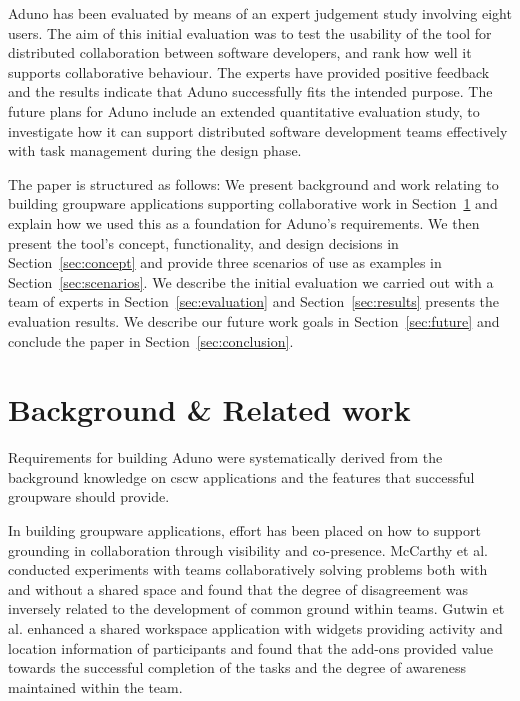\documentclass[conference]{IEEEtran}
\begin{document}
Aduno has been evaluated by means of an expert judgement study involving eight users. The aim of this initial evaluation was to test the usability of the tool for distributed collaboration between software developers, and rank how well it supports collaborative behaviour. The experts have provided positive feedback and the results indicate that Aduno successfully fits the intended purpose.  The future plans for Aduno include an extended quantitative evaluation study, to investigate how it can support distributed software development teams effectively with task management during the design phase.

The paper is structured as follows: We present background and work relating to building groupware applications supporting collaborative work in Section~\ref{sec:background} and explain how we used this as a foundation for Aduno's requirements. We then present the tool's concept, functionality, and design decisions in Section~\ref{sec:concept} and provide three scenarios of use as examples in Section~\ref{sec:scenarios}. We describe the initial evaluation we carried out with a team of experts in Section~\ref{sec:evaluation} and Section~\ref{sec:results} presents the evaluation results. We describe our future work goals in Section~\ref{sec:future} and conclude the paper in Section~\ref{sec:conclusion}.


\section{Background \& Related work}
\label{sec:background}

Requirements for building Aduno were systematically derived from the background knowledge on {\sc cscw} applications and the features that successful groupware should provide. 

In building groupware applications, effort has been placed on how to support grounding in collaboration through visibility and co-presence. McCarthy et al. \cite{MCMM91} conducted experiments with teams collaboratively solving problems both with and without a shared space and found that the degree of disagreement was inversely related to the development of common ground within teams. Gutwin et al. \cite{GRG96} enhanced a shared workspace application with widgets providing activity and location information of participants and found that the add-ons provided value towards the successful completion of the tasks and the degree of awareness maintained within the team.
\end{document}
